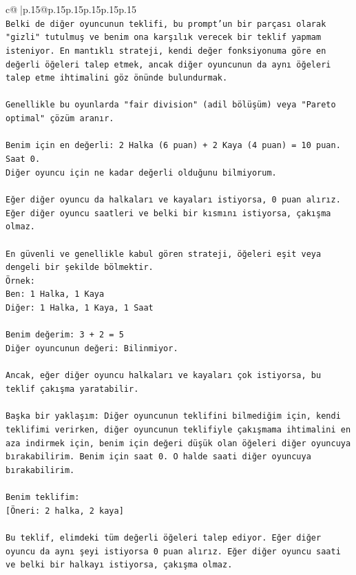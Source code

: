 \documentclass{article}
\begin{document}
{\begin{supertabular}{c@{$\;$}|p{.15\linewidth}@{}p{.15\linewidth}p{.15\linewidth}p{.15\linewidth}p{.15\linewidth}p{.15\linewidth}}
{{{\\ 
\texttt{Belki de diğer oyuncunun teklifi, bu prompt'un bir parçası olarak "gizli" tutulmuş ve benim ona karşılık verecek bir teklif yapmam isteniyor. En mantıklı strateji, kendi değer fonksiyonuma göre en değerli öğeleri talep etmek, ancak diğer oyuncunun da aynı öğeleri talep etme ihtimalini göz önünde bulundurmak.} \\
\\ 
\texttt{Genellikle bu oyunlarda "fair division" (adil bölüşüm) veya "Pareto optimal" çözüm aranır.} \\
\\ 
\texttt{Benim için en değerli: 2 Halka (6 puan) + 2 Kaya (4 puan) = 10 puan. Saat 0.} \\
\texttt{Diğer oyuncu için ne kadar değerli olduğunu bilmiyorum.} \\
\\ 
\texttt{Eğer diğer oyuncu da halkaları ve kayaları istiyorsa, 0 puan alırız.} \\
\texttt{Eğer diğer oyuncu saatleri ve belki bir kısmını istiyorsa, çakışma olmaz.} \\
\\ 
\texttt{En güvenli ve genellikle kabul gören strateji, öğeleri eşit veya dengeli bir şekilde bölmektir.} \\
\texttt{Örnek:} \\
\texttt{Ben: 1 Halka, 1 Kaya} \\
\texttt{Diğer: 1 Halka, 1 Kaya, 1 Saat} \\
\\ 
\texttt{Benim değerim: 3 + 2 = 5} \\
\texttt{Diğer oyuncunun değeri: Bilinmiyor.} \\
\\ 
\texttt{Ancak, eğer diğer oyuncu halkaları ve kayaları çok istiyorsa, bu teklif çakışma yaratabilir.} \\
\\ 
\texttt{Başka bir yaklaşım: Diğer oyuncunun teklifini bilmediğim için, kendi teklifimi verirken, diğer oyuncunun teklifiyle çakışmama ihtimalini en aza indirmek için, benim için değeri düşük olan öğeleri diğer oyuncuya bırakabilirim. Benim için saat 0. O halde saati diğer oyuncuya bırakabilirim.} \\
\\ 
\texttt{Benim teklifim:} \\
\texttt{{[}Öneri: 2 halka, 2 kaya{]}} \\
\\ 
\texttt{Bu teklif, elimdeki tüm değerli öğeleri talep ediyor. Eğer diğer oyuncu da aynı şeyi istiyorsa 0 puan alırız. Eğer diğer oyuncu saati ve belki bir halkayı istiyorsa, çakışma olmaz.} \\
}}}
\end{supertabular}}
\end{document}
